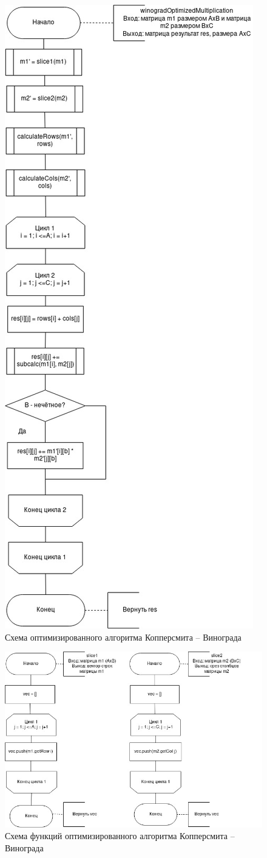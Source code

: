 \documentclass[12pt]{report}
\begin{document}
\begin{figure}[h]
	\centering
	\includegraphics[width=0.5\linewidth]{winograd_opt_0.jpg}
	\caption{Схема оптимизированного алгоритма Копперсмита -- Винограда}
	\label{fig:mpr}
\end{figure}

\begin{figure}[h]
	\centering
	\includegraphics[scale=0.8]{winograd_opt_1.jpg}
	\caption{Схема функций оптимизированного алгоритма Копперсмита -- Винограда}
	\label{fig:mpr}
\end{figure}
\end{document}
